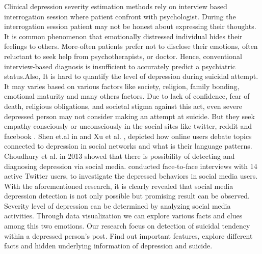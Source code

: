 \documentclass[sn-mathphys,Numbered]{sn-jnl}%
\theoremstyle{thmstyleone}%
\theoremstyle{thmstyletwo}%
\theoremstyle{thmstylethree}%
\begin{document}
Clinical depression severity estimation methods rely on interview based interrogation session where patient confront with psychologist. During the interrogation session patient may not be honest about expressing their thoughts. It is common phenomenon that emotionally distressed individual hides their feelings to others. More-often patients prefer not to disclose their emotions, often reluctant to seek help from psychotherapists, or doctor. Hence, conventional interview-based diagnosis is insufficient to accurately predict a psychiatric status.Also, It is hard to quantify the level of depression during suicidal attempt. It may varies based on various factors like society, religion, family bonding, emotional maturity and many others factors. Due to lack of confidence, fear of death, religious obligations, and societal stigma against this act, even severe depressed person may not consider making an attempt at suicide. But they seek empathy consciously or unconsciously in the social sites like twitter, reddit and facebook \cite{chen2018}. Shen et.al in \cite{shen2017depression} and Xu et al. \cite{xu2016contribution}, depicted how online users debate topics connected to depression in social networks and what is their language patterns. Choudhury et al. in 2013 \cite{de2013predicting} showed that there is possibility of detecting and diagnosing depression via social media. \cite{park2013perception} conducted face-to-face interviews with 14 active Twitter users, to investigate the depressed behaviors in social media users.  With the aforementioned research, it is clearly revealed that social media depression detection is not only possible but promising result can be observed. Severity level of depression can be determined by analyzing social media activities. Through data visualization we can explore various facts and clues among this two emotions. Our research focus on detection of suicidal tendency within a depressed person’s post. Find out important features, explore different facts and hidden underlying information of depression and suicide.  
\end{document}
